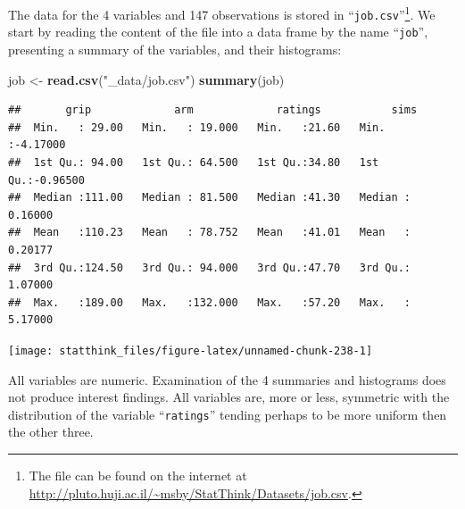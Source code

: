 \documentclass[]{krantz}
\makeatletter
\newenvironment{Shaded}{\begin{snugshade}}{\end{snugshade}}
\newcommand{\CommentTok}[1]{\textcolor[rgb]{0.56,0.35,0.01}{\textit{#1}}}
\newcommand{\DataTypeTok}[1]{\textcolor[rgb]{0.13,0.29,0.53}{#1}}
\newcommand{\DecValTok}[1]{\textcolor[rgb]{0.00,0.00,0.81}{#1}}
\newcommand{\KeywordTok}[1]{\textcolor[rgb]{0.13,0.29,0.53}{\textbf{#1}}}
\newcommand{\NormalTok}[1]{#1}
\newcommand{\OperatorTok}[1]{\textcolor[rgb]{0.81,0.36,0.00}{\textbf{#1}}}
\newcommand{\StringTok}[1]{\textcolor[rgb]{0.31,0.60,0.02}{#1}}
\newenvironment{kframe}{%
\medskip{}
\setlength{\fboxsep}{.8em}
 \def\at@end@of@kframe{}%
 \ifinner\ifhmode%
  \def\at@end@of@kframe{\end{minipage}}%
  \begin{minipage}{\columnwidth}%
 \fi\fi%
 \def\FrameCommand##1{\hskip\@totalleftmargin \hskip-\fboxsep
 \colorbox{shadecolor}{##1}\hskip-\fboxsep
     \hskip-\linewidth \hskip-\@totalleftmargin \hskip\columnwidth}%
 \MakeFramed {\advance\hsize-\width
   \@totalleftmargin\z@ \linewidth\hsize
   \@setminipage}}%
 {\par\unskip\endMakeFramed%
 \at@end@of@kframe}
\renewenvironment{Shaded}{\begin{kframe}}{\end{kframe}}
\theoremstyle{definition}
\theoremstyle{definition}
\theoremstyle{definition}
\theoremstyle{remark}
\makeatother
\begin{document}
The data for the 4 variables and 147 observations is stored in
``\texttt{job.csv}''\footnote{The file can be found on the internet at
  \url{http://pluto.huji.ac.il/~msby/StatThink/Datasets/job.csv}.}. We start by reading the content of the file into a data
frame by the name ``\texttt{job}'', presenting a summary of the variables, and
their histograms:

\begin{Shaded}
\begin{Highlighting}[]
\NormalTok{job <-}\StringTok{ }\KeywordTok{read.csv}\NormalTok{(}\StringTok{"_data/job.csv"}\NormalTok{)}
\KeywordTok{summary}\NormalTok{(job)}
\end{Highlighting}
\end{Shaded}

\begin{verbatim}
##       grip             arm             ratings           sims         
##  Min.   : 29.00   Min.   : 19.000   Min.   :21.60   Min.   :-4.17000  
##  1st Qu.: 94.00   1st Qu.: 64.500   1st Qu.:34.80   1st Qu.:-0.96500  
##  Median :111.00   Median : 81.500   Median :41.30   Median : 0.16000  
##  Mean   :110.23   Mean   : 78.752   Mean   :41.01   Mean   : 0.20177  
##  3rd Qu.:124.50   3rd Qu.: 94.000   3rd Qu.:47.70   3rd Qu.: 1.07000  
##  Max.   :189.00   Max.   :132.000   Max.   :57.20   Max.   : 5.17000
\end{verbatim}

\begin{Shaded}
\end{Shaded}

\begin{center}\texttt{[image: statthink\_files/figure-latex/unnamed-chunk-238-1]} \end{center}

All variables are numeric. Examination of the 4 summaries and
histograms does not produce interest findings. All variables are, more
or less, symmetric with the distribution of the variable ``\texttt{ratings}''
tending perhaps to be more uniform then the other three.
\end{document}

